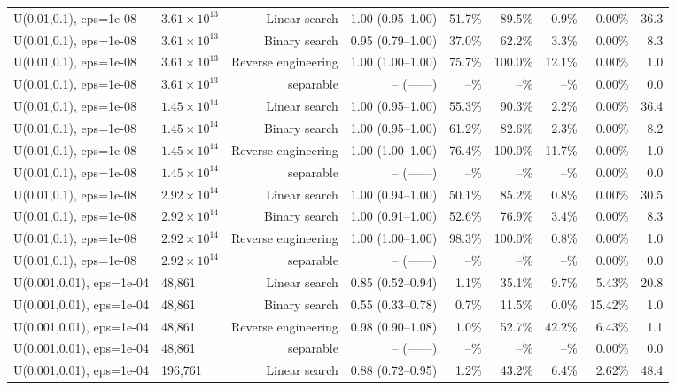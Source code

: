 \begin{tabular}{llrrrrrrr}
U(0.01,0.1), eps=1e-08 & $3.61\times 10^{13}$ & Linear search & 1.00 (0.95--1.00) & 51.7\% & 89.5\% & 0.9\% & 0.00\% & 36.3 \\
U(0.01,0.1), eps=1e-08 & $3.61\times 10^{13}$ & Binary search & 0.95 (0.79--1.00) & 37.0\% & 62.2\% & 3.3\% & 0.00\% & 8.3 \\
U(0.01,0.1), eps=1e-08 & $3.61\times 10^{13}$ & Reverse engineering & 1.00 (1.00--1.00) & 75.7\% & 100.0\% & 12.1\% & 0.00\% & 1.0 \\
U(0.01,0.1), eps=1e-08 & $3.61\times 10^{13}$ & separable & -- (------) & --\% & --\% & --\% & 0.00\% & 0.0 \\
U(0.01,0.1), eps=1e-08 & $1.45\times 10^{14}$ & Linear search & 1.00 (0.95--1.00) & 55.3\% & 90.3\% & 2.2\% & 0.00\% & 36.4 \\
U(0.01,0.1), eps=1e-08 & $1.45\times 10^{14}$ & Binary search & 1.00 (0.95--1.00) & 61.2\% & 82.6\% & 2.3\% & 0.00\% & 8.2 \\
U(0.01,0.1), eps=1e-08 & $1.45\times 10^{14}$ & Reverse engineering & 1.00 (1.00--1.00) & 76.4\% & 100.0\% & 11.7\% & 0.00\% & 1.0 \\
U(0.01,0.1), eps=1e-08 & $1.45\times 10^{14}$ & separable & -- (------) & --\% & --\% & --\% & 0.00\% & 0.0 \\
U(0.01,0.1), eps=1e-08 & $2.92\times 10^{14}$ & Linear search & 1.00 (0.94--1.00) & 50.1\% & 85.2\% & 0.8\% & 0.00\% & 30.5 \\
U(0.01,0.1), eps=1e-08 & $2.92\times 10^{14}$ & Binary search & 1.00 (0.91--1.00) & 52.6\% & 76.9\% & 3.4\% & 0.00\% & 8.3 \\
U(0.01,0.1), eps=1e-08 & $2.92\times 10^{14}$ & Reverse engineering & 1.00 (1.00--1.00) & 98.3\% & 100.0\% & 0.8\% & 0.00\% & 1.0 \\
U(0.01,0.1), eps=1e-08 & $2.92\times 10^{14}$ & separable & -- (------) & --\% & --\% & --\% & 0.00\% & 0.0 \\
U(0.001,0.01), eps=1e-04 & 48,861 & Linear search & 0.85 (0.52--0.94) & 1.1\% & 35.1\% & 9.7\% & 5.43\% & 20.8 \\
U(0.001,0.01), eps=1e-04 & 48,861 & Binary search & 0.55 (0.33--0.78) & 0.7\% & 11.5\% & 0.0\% & 15.42\% & 1.0 \\
U(0.001,0.01), eps=1e-04 & 48,861 & Reverse engineering & 0.98 (0.90--1.08) & 1.0\% & 52.7\% & 42.2\% & 6.43\% & 1.1 \\
U(0.001,0.01), eps=1e-04 & 48,861 & separable & -- (------) & --\% & --\% & --\% & 0.00\% & 0.0 \\
U(0.001,0.01), eps=1e-04 & 196,761 & Linear search & 0.88 (0.72--0.95) & 1.2\% & 43.2\% & 6.4\% & 2.62\% & 48.4 \\

\end{tabular}
